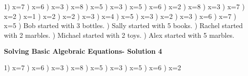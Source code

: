 \documentclass{article}%
\begin{document}
1) x=7%
) x=6%
) x=3%
) x=8%
) x=5%
) x=3%
) x=5%
) x=6%
) x=2%
) x=8%
) x=3%
) x=7%
) x=2%
) x=1%
) x=2%
) x=2%
) x=3%
) x=4%
) x=5%
) x=3%
) x=2%
) x=3%
) x=6%
) x=7%
) x=5%
) Bob started with 3 bottles.%
) Sally started with 5 books.%
) Rachel started with 2 marbles.%
) Michael started with 2 toys.%
) Alex started with 5 marbles.%
\newline%
\newpage%
\large%
\begin{center}%
\textbf{Solving Basic Algebraic Equations- Solution 4}%
\newline%
\end{center} \normalsize%
1) x=7%
) x=6%
) x=3%
) x=8%
) x=5%
) x=3%
) x=5%
) x=6%
) x=2%
\end{document}
